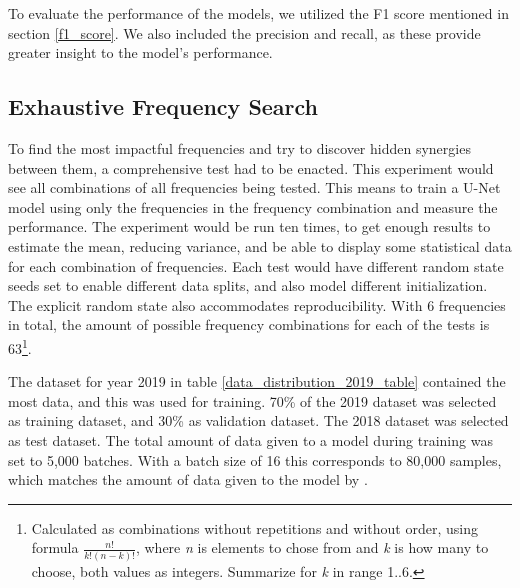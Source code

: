         To evaluate the performance of the models, we utilized the F1 score mentioned in section \ref{f1_score}. We also included the precision and recall, as these provide greater insight to the model's performance.
        
    
    \subsection{Exhaustive Frequency Search}
    
        To find the most impactful frequencies and try to discover hidden synergies between them, a comprehensive test had to be enacted. This experiment would see all combinations of all frequencies being tested. This means to train a U-Net model using only the frequencies in the frequency combination and measure the performance. The experiment would be run ten times, to get enough results to estimate the mean,  reducing variance, and be able to display some statistical data for each combination of frequencies. Each test would have different random state seeds set to enable different data splits, and also model different initialization. The explicit random state also accommodates reproducibility. With 6 frequencies in total, the amount of possible frequency combinations for each of the tests is 63\footnote{Calculated as combinations without repetitions and without order, using formula $\frac{n!}{k!(n-k)!}$, where \textit{n} is elements to chose from and \textit{k} is how many to choose, both values as integers. Summarize for \textit{k} in range 1..6.}.
        
        The dataset for year 2019 in table \ref{data_distribution_2019_table} contained the most data, and this was used for training. 70\% of the 2019 dataset was selected as training dataset, and 30\% as validation dataset. The 2018 dataset was selected as test dataset. The total amount of data given to a model during training was set to 5,000 batches. With a batch size of 16 this corresponds to 80,000 samples, which matches the amount of data given to the model by \citeauthor{brautaset2020acoustic}\cite{brautaset2020acoustic}.
        
